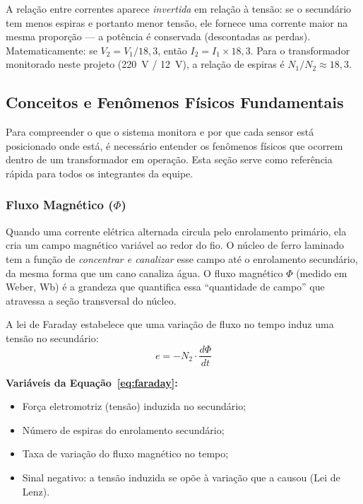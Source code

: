 \documentclass[12pt, a4paper]{article}
\begin{document}
\noindent A relação entre correntes aparece \emph{invertida} em relação à tensão: se o secundário tem menos espiras e portanto menor tensão, ele fornece uma corrente maior na mesma proporção --- a potência é conservada (descontadas as perdas). Matematicamente: se $V_2 = V_1/18{,}3$, então $I_2 = I_1 \times 18{,}3$. Para o transformador monitorado neste projeto (220~V / 12~V), a relação de espiras é $N_1/N_2 \approx 18{,}3$.

\subsection{Conceitos e Fenômenos Físicos Fundamentais}

Para compreender o que o sistema monitora e por que cada sensor está posicionado onde está, é necessário entender os fenômenos físicos que ocorrem dentro de um transformador em operação. Esta seção serve como referência rápida para todos os integrantes da equipe.

\subsubsection{Fluxo Magnético ($\Phi$)}

Quando uma corrente elétrica alternada circula pelo enrolamento primário, ela cria um campo magnético variável ao redor do fio. O núcleo de ferro laminado tem a função de \emph{concentrar e canalizar} esse campo até o enrolamento secundário, da mesma forma que um cano canaliza água. O fluxo magnético $\Phi$ (medido em Weber, Wb) é a grandeza que quantifica essa ``quantidade de campo'' que atravessa a seção transversal do núcleo.

A lei de Faraday estabelece que uma variação de fluxo no tempo induz uma tensão no secundário:
\begin{equation}
    e = -N_2 \cdot \frac{d\Phi}{dt}
    \label{eq:faraday}
\end{equation}

\noindent\textbf{Variáveis da Equação~\ref{eq:faraday}:}
\begin{itemize}[leftmargin=3cm, itemsep=2pt, topsep=4pt]
    \item[$e$ (V)]           Força eletromotriz (tensão) induzida no secundário;
    \item[$N_2$]             Número de espiras do enrolamento secundário;
    \item[$d\Phi/dt$ (Wb/s)] Taxa de variação do fluxo magnético no tempo;
    \item[``$-$'']           Sinal negativo: a tensão induzida se opõe à variação que a causou (Lei de Lenz).
\end{itemize}
\end{document}
